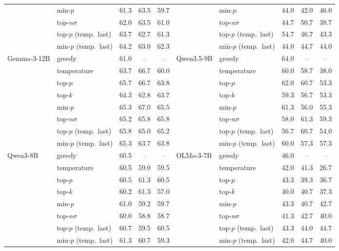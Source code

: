 \begin{tabular}{llccc@{\hspace{14pt}}llccc}
 & min-$p$ & 61.3 & 63.5 & 59.7 &  & min-$p$ & 44.0 & 42.0 & 46.0 \\
 & top-$n\sigma$ & 62.0 & 63.5 & 61.0 &  & top-$n\sigma$ & 44.7 & 50.7 & 38.7 \\
 & top-$p$ (temp.\ last) & 63.7 & 62.7 & 61.3 &  & top-$p$ (temp.\ last) & 54.7 & 46.7 & 43.3 \\
 & min-$p$ (temp.\ last) & 64.2 & 63.0 & 62.3 &  & min-$p$ (temp.\ last) & 44.0 & 44.7 & 44.0 \\
\midrule
Gemma-3-12B & greedy & 61.0 & -- & -- & Qwen3.5-9B & greedy & 64.0 & -- & -- \\
 & temperature & 63.7 & 66.7 & 60.0 &  & temperature & 60.0 & 58.7 & 38.0 \\
 & top-$p$ & 65.7 & 66.7 & 63.8 &  & top-$p$ & 62.0 & 60.7 & 53.3 \\
 & top-$k$ & 64.3 & 62.8 & 63.7 &  & top-$k$ & 59.3 & 56.7 & 53.3 \\
 & min-$p$ & 65.3 & 67.0 & 65.5 &  & min-$p$ & 61.3 & 56.0 & 55.3 \\
 & top-$n\sigma$ & 65.2 & 65.8 & 65.8 &  & top-$n\sigma$ & 58.0 & 61.3 & 59.3 \\
 & top-$p$ (temp.\ last) & 65.8 & 65.0 & 65.2 &  & top-$p$ (temp.\ last) & 56.7 & 60.7 & 54.0 \\
 & min-$p$ (temp.\ last) & 65.3 & 63.7 & 63.8 &  & min-$p$ (temp.\ last) & 60.0 & 57.3 & 57.3 \\
\midrule
Qwen3-8B & greedy & 60.5 & -- & -- & OLMo-3-7B & greedy & 46.0 & -- & -- \\
 & temperature & 60.5 & 59.0 & 59.5 &  & temperature & 42.0 & 41.3 & 26.7 \\
 & top-$p$ & 60.5 & 61.3 & 60.5 &  & top-$p$ & 43.3 & 39.3 & 36.7 \\
 & top-$k$ & 60.2 & 61.3 & 57.0 &  & top-$k$ & 40.0 & 40.7 & 37.3 \\
 & min-$p$ & 61.0 & 59.2 & 59.7 &  & min-$p$ & 43.3 & 40.7 & 42.7 \\
 & top-$n\sigma$ & 60.0 & 58.8 & 58.7 &  & top-$n\sigma$ & 41.3 & 42.7 & 40.0 \\
 & top-$p$ (temp.\ last) & 60.7 & 59.5 & 60.5 &  & top-$p$ (temp.\ last) & 43.3 & 44.0 & 44.7 \\
 & min-$p$ (temp.\ last) & 61.3 & 60.7 & 59.3 &  & min-$p$ (temp.\ last) & 42.0 & 44.7 & 40.0 \\
\bottomrule
\end{tabular}

